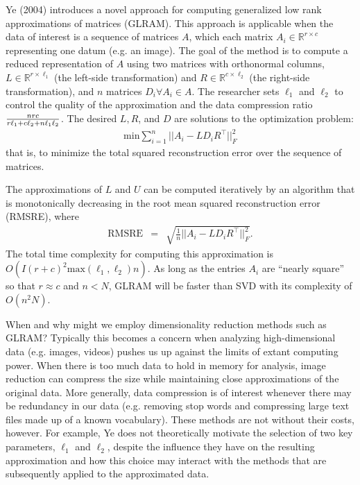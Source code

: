 \documentclass[12pt,letterpaper]{article}
\begin{document}
Ye (2004) introduces a novel approach for computing generalized low rank approximations of matrices (GLRAM). This approach is applicable when the data of interest is a sequence of matrices $A$, which each matrix $A_i \in \mathbb{R}^{r \times c}$ representing one datum (e.g. an image). The goal of the method is to compute a reduced representation of $A$ using two matrices with orthonormal columns, $L \in \mathbb{R}^{r \times \ell_1}$ (the left-side transformation) and $R \in \mathbb{R}^{c \times \ell_2}$ (the right-side transformation), and $n$ matrices $D_i \forall A_i \in A$. The researcher sets $\ell_1$ and $\ell_2$ to control the quality of the approximation and the data compression ratio $nrc \over r \ell_1 + c \ell_2 + n \ell_1 \ell_2$. The desired $L, R$, and $D$ are solutions to the optimization problem:
\begin{eqnarray*}
\text{min} \sum_{i=1}^n || A_i - LD_iR^\intercal ||^2_F
\end{eqnarray*}
that is, to minimize the total squared reconstruction error over the sequence of matrices. 

The approximations of $L$ and $U$ can be computed iteratively by an algorithm that is monotonically decreasing in the root mean squared reconstruction error (RMSRE), where 
\begin{eqnarray*}
\text{RMSRE} &=& \sqrt{\frac{1}{n} || A_i - LD_iR^\intercal ||^2_F}.
\end{eqnarray*}
The total time complexity for computing this approximation is $O(I(r+c)^2 \text{max}(\ell_1, \ell_2)n)$. As long as the entries $A_i$ are ``nearly square'' so that $r \approx c$ and $n<N$, GLRAM will be faster than SVD with its complexity of $O(n^2 N)$. 

When and why might we employ dimensionality reduction methods such as GLRAM? Typically this becomes a concern when analyzing high-dimensional data (e.g. images, videos) pushes us up against the limits of extant computing power. When there is too much data to hold in memory for analysis, image reduction can compress the size while maintaining close approximations of the original data. More generally, data compression is of interest whenever there may be redundancy in our data (e.g. removing stop words and compressing large text files made up of a known vocabulary). These methods are not without their costs, however. For example, Ye does not theoretically motivate the selection of two key parameters, $\ell_1$ and $\ell_2$, despite the influence they have on the resulting approximation and how this choice may interact with the methods that are subsequently applied to the approximated data. 




\end{document}
